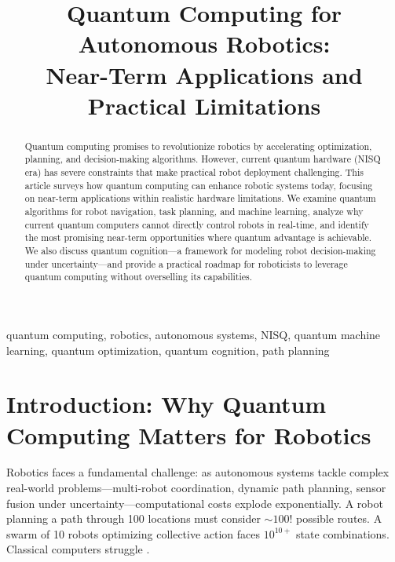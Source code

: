 \documentclass[journal]{IEEEtran}
\begin{document}
\title{Quantum Computing for Autonomous Robotics:\\Near-Term Applications and Practical Limitations}

\author{
}

\maketitle

\begin{abstract}
Quantum computing promises to revolutionize robotics by accelerating optimization, planning, and decision-making algorithms. However, current quantum hardware (NISQ era) has severe constraints that make practical robot deployment challenging. This article surveys how quantum computing can enhance robotic systems today, focusing on near-term applications within realistic hardware limitations. We examine quantum algorithms for robot navigation, task planning, and machine learning, analyze why current quantum computers cannot directly control robots in real-time, and identify the most promising near-term opportunities where quantum advantage is achievable. We also discuss quantum cognition---a framework for modeling robot decision-making under uncertainty---and provide a practical roadmap for roboticists to leverage quantum computing without overselling its capabilities.
\end{abstract}

\begin{IEEEkeywords}
quantum computing, robotics, autonomous systems, NISQ, quantum machine learning, quantum optimization, quantum cognition, path planning
\end{IEEEkeywords}

\section{Introduction: Why Quantum Computing Matters for Robotics}

Robotics faces a fundamental challenge: as autonomous systems tackle complex real-world problems---multi-robot coordination, dynamic path planning, sensor fusion under uncertainty---computational costs explode exponentially. A robot planning a path through 100 locations must consider $\sim100!$ possible routes. A swarm of 10 robots optimizing collective action faces $10^{10+}$ state combinations. Classical computers struggle \cite{b1, b2, b3}.
\end{document}
